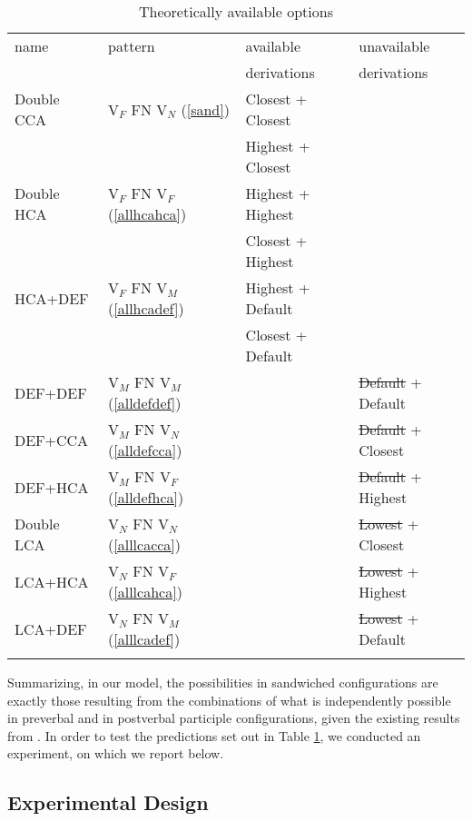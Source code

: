 \documentclass[output=paper
,modfonts
,nonflat]{langsci/langscibook}
\begin{document}
\begin{table}
\begin{tabularx}{\textwidth}{llll}
\lsptoprule
name & pattern & available & unavailable  \\
{} & {} & derivations & derivations \\ \midrule
Double CCA & V$_F$ FN V$_N$ (\ref{sand})& Closest + Closest  & {}\\
{} & {} & Highest + Closest & {} 
\\ \midrule
Double HCA & V$_F$ FN V$_F$ (\ref{allhcahca})& Highest + Highest & {} \\ 
{} & {} & Closest + Highest & {} \\
\midrule
HCA+DEF & V$_F$ FN V$_M$ (\ref{allhcadef})& Highest + Default & {} \\
{} & {} &  Closest + Default & {} \\ \midrule
DEF+DEF & V$_M$ FN V$_M$ (\ref{alldefdef})& {} & \sout{Default} + Default \\ \midrule
DEF+CCA & V$_M$ FN V$_N$ (\ref{alldefcca})& {} & \sout{Default} + Closest \\ 
\midrule
DEF+HCA & V$_M$ FN V$_F$ (\ref{alldefhca})& {} & \sout{Default} + Highest \\ \midrule
Double LCA & V$_N$ FN V$_N$ (\ref{alllcacca})& &\sout{Lowest} + Closest \\ 
\midrule
LCA+HCA & V$_N$ FN V$_F$ (\ref{alllcahca})& {} & \sout{Lowest} + Highest \\ \midrule
LCA+DEF & V$_N$ FN V$_M$ (\ref{alllcadef})& {} & \sout{Lowest} + Default \\ 
\lspbottomrule
\end{tabularx} 
\caption{Theoretically available options}
\label{tab:sandwichoptions}
\end{table}
\newpage \noindent
Summarizing, in our model, the possibilities in sandwiched configurations are exactly those resulting from the combinations of what is independently possible in preverbal and in postverbal participle configurations, given the existing results from \citet{marusicnevinsbadecker:15,willergold:16}. In order to test the predictions set out in Table \ref{tab:sandwichoptions}, we conducted an experiment, on which we report below.

\subsection{Experimental Design} \label{sec:expdesign}
\end{document}

